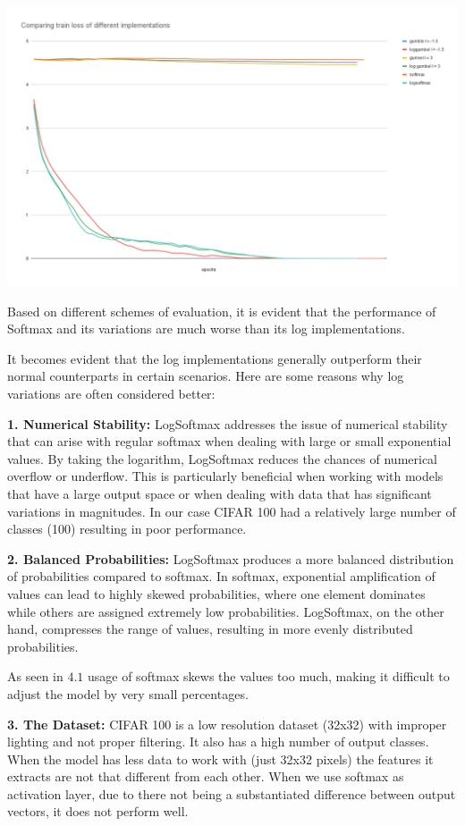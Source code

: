 \documentclass{article}
\begin{document}
\includegraphics[width=0.9\linewidth]{images/Comparing train loss of different implementations.png}

\vspace{6pt}

Based on different schemes of evaluation, it is evident that the performance of Softmax and its variations are much worse than its log implementations.

It becomes evident that the log implementations generally outperform their normal counterparts in certain scenarios. Here are some reasons why log variations are often considered better:

\textbf{1. Numerical Stability:} LogSoftmax addresses the issue of numerical stability that can arise with regular softmax when dealing with large or small exponential values. By taking the logarithm, LogSoftmax reduces the chances of numerical overflow or underflow. This is particularly beneficial when working with models that have a large output space or when dealing with data that has significant variations in magnitudes.
In our case CIFAR 100 had a relatively large number of classes (100) resulting in poor performance. 

\textbf{2. Balanced Probabilities:} LogSoftmax produces a more balanced distribution of probabilities compared to softmax. In softmax, exponential amplification of values can lead to highly skewed probabilities, where one element dominates while others are assigned extremely low probabilities. LogSoftmax, on the other hand, compresses the range of values, resulting in more evenly distributed probabilities.

As seen in \(4.1\) usage of softmax skews the values too much, making it difficult to adjust the model by very small percentages.

\textbf{3. The Dataset:} CIFAR 100 is a low resolution dataset (32x32) with improper lighting and not proper filtering. It also has a high number of output classes. When the model has less data to work with (just 32x32 pixels) the features it extracts are not that different from each other. When we use softmax as activation layer, due to there not being a substantiated difference between output vectors, it does not perform well.
\end{document}
